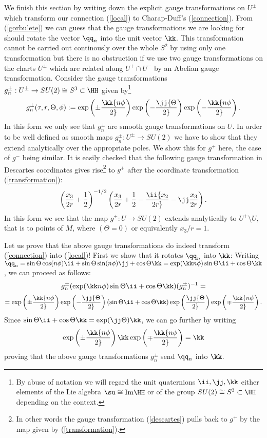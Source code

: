 \documentclass[a4paper,12pt,draft]{article}
\begin{document}
We finish this section by writing down the explicit gauge 
transformations on $U^\pm$ which transform our connection (\ref{local}) to 
Charap-Duff's (\ref{connection}). From (\ref{gorbulete}) we can guess
that the gauge transformations we are looking for
should rotate the vector $\qq_n$ 
into the unit vector $\kk$. This transformation
cannot be carried out continously over the whole $S^2$ by using only one
transformation but there is no obstruction if we use two gauge 
transformations on the charts $U^\pm$  which are related along $U^+\cap
U^-$ by an Abelian gauge transformation. Consider the gauge transformations
$g_n^\pm :U^\pm\rightarrow SU(2)\cong S^3\subset\HH$ given by\footnote{By
abuse of notation we will regard the unit quaternions $\ii ,\jj ,\kk$
either elements of the Lie algebra $\su\cong {\rm Im}\HH$ or of the group
$SU(2)\cong S^3\subset\HH$ depending on the context.}
\[ g^\pm_n(\tau, r,\Theta,\phi ):=\exp\left(\pm\kk{n\phi\over
2}\right)\exp\left(-\jj{\Theta\over 2}\right)\exp\left(-\kk{n\phi\over
2}\right) .\]
In this form we only  see that $g_n^\pm$ are smooth gauge transformations
on $U$. In order to be well defined as smooth 
maps $g_n^\pm :U^\pm\rightarrow SU(2)$ we have to show that they extend 
analytically over the appropriate poles. We show this for $g^+$ here, the
case of $g^-$ being similar. It is easily checked 
that the following gauge transformation in  Descartes coordinates gives 
rise\footnote{In other words the gauge transformation 
(\ref{descartes}) pulls back to $g^+$
by the map given by (\ref{transformation}).}
to $g^+$ after the coordinate 
transformation (\ref{transformation}):
\begin{eqnarray}
\left( {x_3\over 2r}+{1\over 2}\right)^{-1/2}\left( {x_3\over 2r}+{1\over 2}-
\ii {x_2\over 2r}-{\jj }{x_3\over 2r}\right).\label{descartes}\end{eqnarray}
In this form we see that the map $g^+:U\rightarrow SU(2)$ extends
analytically to $U^+\setminus U$, that is to 
points of $M$, where $(\Theta=0)$ or equivalently $ x_3/r =1$. 

Let us prove that the above gauge transformations do indeed transform
(\ref{connection}) into (\ref{local})!
First we show that it rotates $\qq_n$ into $\kk$: 
Writing  $\qq_n=\sin\Theta\cos (n\phi )\ii +\sin\Theta\sin (n\phi )\jj
+\cos\Theta\kk =\exp(\kk n\phi )\sin\Theta\ii +\cos\Theta\kk$, we can
proceed as follows:
\[g^\pm_n(\exp (\kk n\phi )\sin\Theta\ii +\cos\Theta\kk )(g_n^\pm)^{-1} 
=\]
\[=\exp\left(\pm\kk{n\phi\over 2}\right)\exp\left(-\jj{\Theta\over
2}\right)(\sin\Theta\ii +\cos\Theta\kk )\exp\left(\jj{\Theta\over
2}\right)\exp\left(\mp\kk{n\phi\over 2}\right) .\]
Since $\sin\Theta\ii +\cos\Theta\kk =\exp (\jj\Theta )\kk$, we can go
further by writing
\[\exp\left(\pm\kk{n\phi\over 2}\right)\kk\exp\left(\mp\kk{n\phi\over
2}\right)=\kk\] 
proving that the above gauge transformations $g^\pm_n$
send $\qq_n$ into $\kk$.
\end{document}
